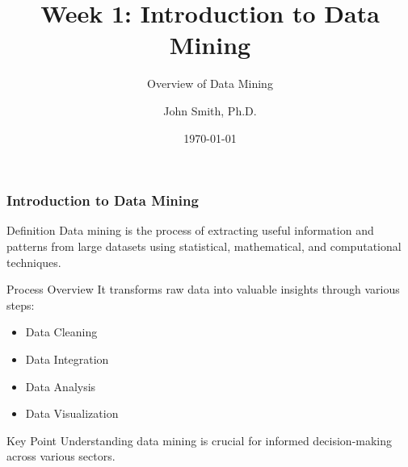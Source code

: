 \documentclass[aspectratio=169]{beamer}
\begin{document}
\frame{\titlepage}

\begin{frame}[fragile]
    \title{Week 1: Introduction to Data Mining}
    \subtitle{Overview of Data Mining}
    \author{John Smith, Ph.D.}
    \date{\today}
    \maketitle
\end{frame}

\begin{frame}[fragile]
    \frametitle{Introduction to Data Mining}
    
    \begin{block}{Definition}
        Data mining is the process of extracting useful information and patterns from large datasets using statistical, mathematical, and computational techniques.
    \end{block}
    
    \begin{block}{Process Overview}
        It transforms raw data into valuable insights through various steps:
        \begin{itemize}
            \item Data Cleaning
            \item Data Integration
            \item Data Analysis
            \item Data Visualization
        \end{itemize}
    \end{block}
    
    \pause
    
    \begin{block}{Key Point}
        Understanding data mining is crucial for informed decision-making across various sectors.
    \end{block}
\end{frame}
\end{document}

